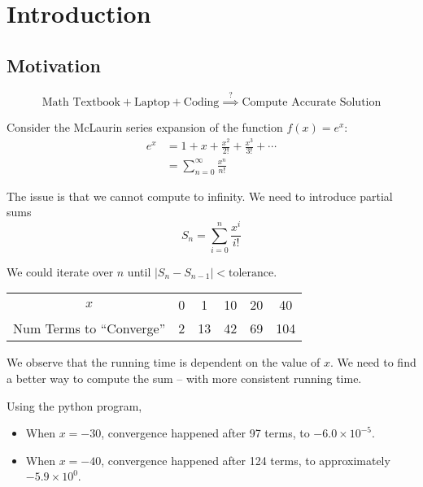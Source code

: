 \chapter{Introduction}

\section{Motivation}

\[
    \text{Math Textbook} + \text{Laptop} + \text{Coding} \overset{?}{\implies} \text{Compute Accurate Solution}
\]

Consider the McLaurin series expansion of the function \( f(x) = e^x \): \begin{align*}
    e^x & = 1 + x + \frac{x^2}{2!} + \frac{x^3}{3!} + \cdots \\
        & = \sum_{n=0}^{\infty} \frac{x^n}{n!}
\end{align*}

The issue is that we cannot compute to infinity. We need to introduce partial sums \[
    S_n = \sum_{i=0}^{n} \frac{x^i}{i!}
\]

We could iterate over \( n \) until \( \left| S_n - S_{n-1} \right| < \text{tolerance} \).

\begin{table}[ht!]
    \centering
    \begin{tabular}{c|ccccc}
        \( x \)                   & 0 & 1  & 10 & 20 & 40  \\
        Num Terms to ``Converge'' & 2 & 13 & 42 & 69 & 104 \\
    \end{tabular}
\end{table}

We observe that the running time is dependent on the value of \( x \). We need to find a better way to compute the sum -- with more consistent running time.

Using the python program,
\begin{itemize}
    \item When \( x = -30 \), convergence happened after 97 terms, to \( -6.0 \times 10^{-5} \).
    \item When \( x = -40 \), convergence happened after 124 terms, to approximately \( -5.9 \times 10^0 \).
\end{itemize}

\begin{figure}[ht!]
    \centering
\end{figure}

